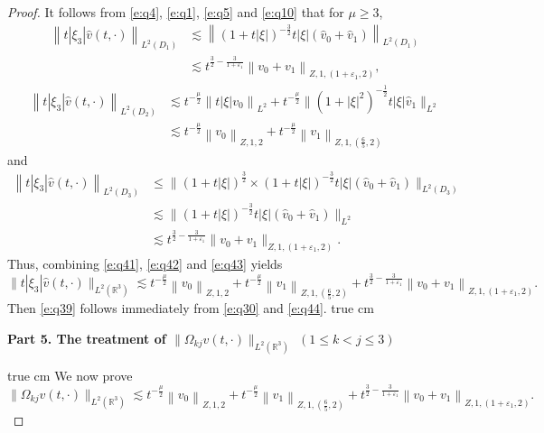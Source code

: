 \documentclass[10pt,a4paper]{amsart}
\newcommand{\R}{\mathbb R}
\newcommand{\f}{\frac}
\begin{document}
\begin{proof}
It follows from  \eqref{e:q4}, \eqref{e:q1}, \eqref{e:q5} and  \eqref{e:q10} that for $\mu\geq3$,
\begin{equation}\label{e:q41}
\begin{aligned}
\left\|t|\xi_3|\hat{v}(t, \cdot)\right\|_{L^2(D_1)} & \lesssim\left\|(1+t|\xi|)^{-\f32}t|\xi|(\hat{v}_{0}+\hat{v}_{1})\right\|_{L^{2}(D_1)} \\
& \lesssim t^{\f32-\f{3}{1+\varepsilon_1}}\left\|v_0+v_1\right\|_{Z, 1,(1+\varepsilon_1, 2)},
\end{aligned}
\end{equation}
\begin{equation}\label{e:q42}
\begin{aligned}
\left\|t|\xi_3|\hat{v}(t, \cdot)\right\|_{L^2(D_2)}
& \lesssim t^{-\frac{\mu}{2}}\left\|t|\xi|v_{0}\right\|_{L^{2}}+t^{-\f{\mu}{2}} \|(1+|\xi|^2)^{-\f{1}{2}}t|\xi|\hat{v}_{1}\|_{L^{2}}\\
&\lesssim t^{-\f{\mu}{2}}\left\|v_0\right\|_{Z, 1, 2}+t^{-\f{\mu}{2}}\left\|v_1\right\|_{Z, 1,(\f65, 2)}
\end{aligned}
\end{equation}
and
\begin{equation}\label{e:q43}
\begin{aligned}
\left\|t|\xi_3|\hat{v}(t, \cdot)\right\|_{L^2(D_3)} & \leq\big\|(1+t|\xi|)^{\f32}\times(1+t|\xi|)^{-\f32}t|\xi|(\hat{v}_{0}+\hat{v}_{1})\big\|_{L^{2}(D_3)} \\
&\lesssim\big\|(1+t|\xi|)^{-\f32}t|\xi|(\hat{v}_{0}+\hat{v}_{1})\big\|_{L^{2}}\\
&\lesssim t^{\f32-\f{3}{1+\varepsilon_1}}\|v_0+v_1\|_{Z, 1, (1+\varepsilon_1, 2)}.
\end{aligned}
\end{equation}
Thus, combining \eqref{e:q41}, \eqref{e:q42} and \eqref{e:q43} yields
\begin{equation}\label{e:q44}
\|t|\xi_3|\hat{v}(t, \cdot)\|_{L^2(\R^3)} \lesssim t^{-\f{\mu}{2}}\left\|v_0\right\|_{Z, 1, 2}
+t^{-\f{\mu}{2}}\left\|v_1\right\|_{Z, 1,(\f65, 2)}+t^{\f32-\f{3}{1+\varepsilon_1}}\left\|v_0+v_1\right\|_{Z, 1,(1+\varepsilon_1, 2)}.
\end{equation}
Then \eqref{e:q39} follows immediately from \eqref{e:q30} and \eqref{e:q44}.
 true cm

{\bf Part 5.  The treatment of $\|\Omega_{kj}v(t, \cdot)\|_{L^2(\R^3)}$ $(1\le k<j\le3)$ }

 true cm
We now prove
\begin{equation}\label{e:q45}
\|\Omega_{kj}v(t, \cdot)\|_{L^2(\R^3)} \lesssim t^{-\f{\mu}{2}}\left\|v_0\right\|_{Z, 1, 2}+t^{-\f{\mu}{2}}\left\|v_1\right\|_{Z, 1,(\f65, 2)}+t^{\f32-\f{3}{1+\varepsilon_1}}\left\|v_0+v_1\right\|_{Z, 1,(1+\varepsilon_1, 2)}.
\end{equation}



\end{proof}
\end{document}
